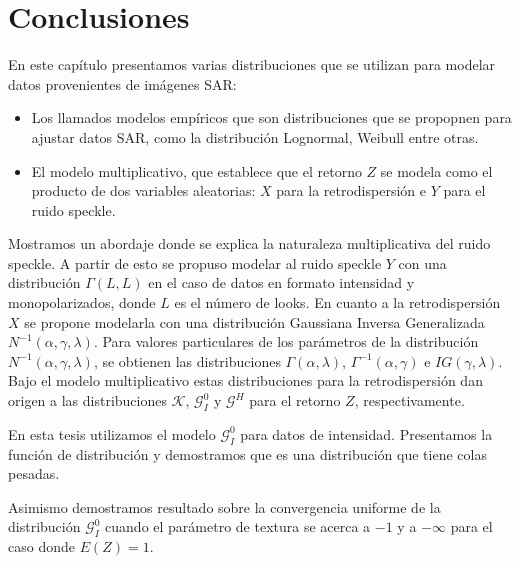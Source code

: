\section{Conclusiones}

En este capítulo presentamos varias distribuciones que se utilizan para modelar datos provenientes de imágenes SAR:
\begin{itemize}
	\item Los llamados modelos empíricos que son distribuciones que se propopnen para ajustar datos SAR, como la distribución Lognormal, Weibull entre otras.
	\item El modelo multiplicativo, que establece que el retorno $Z$ se modela como el producto de dos variables aleatorias: $X$ para la retrodispersión e $Y$ para el ruido speckle.
\end{itemize} 

Mostramos un abordaje donde se explica la naturaleza multiplicativa del ruido speckle. A partir de esto se propuso modelar al ruido speckle $Y$ con una distribución $\Gamma(L,L)$ en el caso de datos en formato intensidad y monopolarizados, donde $L$ es el número de looks. En cuanto a la retrodispersión $X$ se propone modelarla con una distribución Gaussiana Inversa Generalizada $N^{-1}(\alpha,\gamma,\lambda)$. Para valores particulares de los parámetros de la distribución $N^{-1}(\alpha,\gamma,\lambda)$, se obtienen las distribuciones $\Gamma(\alpha,\lambda)$, $\Gamma^{-1}(\alpha,\gamma)$ e $IG(\gamma, \lambda)$. Bajo el modelo multiplicativo estas distribuciones para la retrodispersión dan origen a las distribuciones $\mathcal{K}$, $\mathcal{G}_I^0$ y $\mathcal{G}^H$ para el retorno $Z$, respectivamente. 

En esta tesis utilizamos el modelo $\mathcal{G}_I^0$ para datos de intensidad. Presentamos la función de distribución y demostramos que es una distribución que tiene colas pesadas.

Asimismo demostramos resultado sobre la convergencia uniforme de la distribución $\mathcal{G}_I^0$ cuando el parámetro de textura se acerca a $-1$ y a $-\infty$ para el caso donde $E(Z)=1$.




